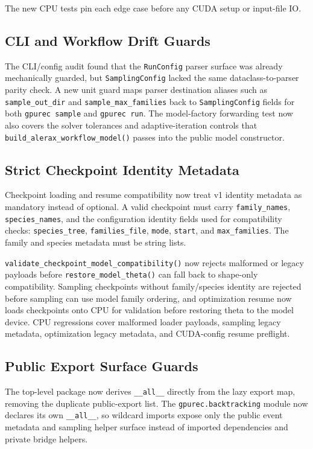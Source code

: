 \documentclass[11pt]{article}
\begin{document}
The new CPU tests pin each edge case before any CUDA setup or input-file IO.

\subsection{CLI and Workflow Drift Guards}

The CLI/config audit found that the \texttt{RunConfig} parser surface was
already mechanically guarded, but \texttt{SamplingConfig} lacked the same
dataclass-to-parser parity check.  A new unit guard maps parser destination
aliases such as \texttt{sample\_out\_dir} and
\texttt{sample\_max\_families} back to \texttt{SamplingConfig} fields for both
\texttt{gpurec sample} and \texttt{gpurec run}.  The model-factory forwarding
test now also covers the solver tolerances and adaptive-iteration controls that
\texttt{build\_alerax\_workflow\_model()} passes into the public model
constructor.

\subsection{Strict Checkpoint Identity Metadata}

Checkpoint loading and resume compatibility now treat v1 identity metadata as
mandatory instead of optional.  A valid checkpoint must carry
\texttt{family\_names}, \texttt{species\_names}, and the configuration identity
fields used for compatibility checks: \texttt{species\_tree},
\texttt{families\_file}, \texttt{mode}, \texttt{start}, and
\texttt{max\_families}.  The family and species metadata must be string lists.

\texttt{validate\_checkpoint\_model\_compatibility()} now rejects malformed or
legacy payloads before \texttt{restore\_model\_theta()} can fall back to
shape-only compatibility.  Sampling checkpoints without family/species identity
are rejected before sampling can use model family ordering, and optimization
resume now loads checkpoints onto CPU for validation before restoring theta to
the model device.  CPU regressions cover malformed loader payloads, sampling
legacy metadata, optimization legacy metadata, and CUDA-config resume preflight.

\subsection{Public Export Surface Guards}

The top-level package now derives \texttt{\_\_all\_\_} directly from the lazy
export map, removing the duplicate public-export list.  The
\texttt{gpurec.backtracking} module now declares its own
\texttt{\_\_all\_\_}, so wildcard imports expose only the public event metadata
and sampling helper surface instead of imported dependencies and private bridge
helpers.
\end{document}
